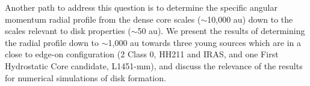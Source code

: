 Another path to address this question is to determine the specific angular momentum radial profile from the dense core scales ($\sim$10,000 au) 
down to the scales relevant to disk properties ($\sim$50 au). 
%
We present the results of determining the radial profile down to $\sim$1,000 au towards three young sources which are in a close to edge-on configuration (2 Class 0, HH211 and IRAS, and one First Hydrostatic Core candidate, L1451-mm), 
and discuss the relevance of the results for numerical simulations of disk formation. 

